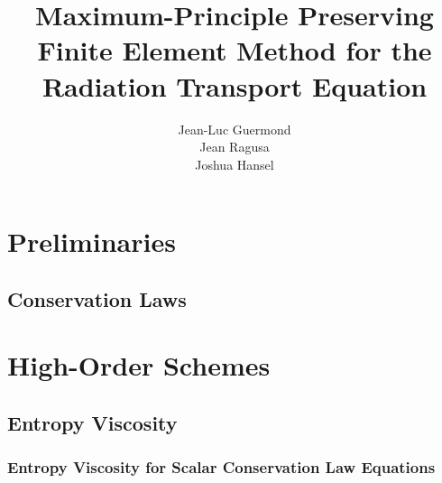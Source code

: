 \documentclass{mathnotes}
\title{Maximum-Principle Preserving Finite Element Method for the
  Radiation Transport Equation}
\author{Jean-Luc Guermond\\Jean Ragusa\\Joshua Hansel}
\begin{document}
\maketitle

\section{Preliminaries}
\subsection{Conservation Laws}
  
%    
%  
\section{High-Order Schemes}  
\subsection{Entropy Viscosity\label{sec:entropy_viscosity}}
  \subsubsection{Entropy Viscosity for Scalar Conservation Law Equations
    \label{sec:entropy_viscosity_scalar}}
    
\end{document}

